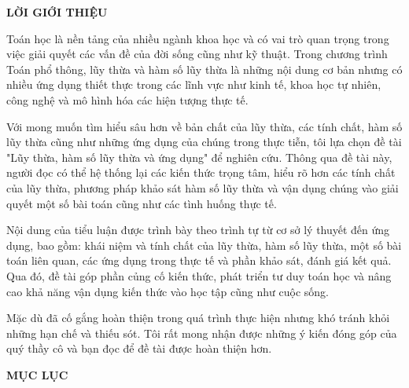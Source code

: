 \documentclass{article}
\begin{document}
\begin{center}
    \textbf{\Large LỜI GIỚI THIỆU}
\end{center}

\vspace{0.5cm}

\noindent Toán học là nền tảng của nhiều ngành khoa học và có vai trò quan trọng trong việc giải quyết các vấn đề của đời sống cũng như kỹ thuật. Trong chương trình Toán phổ thông, lũy thừa và hàm số lũy thừa là những nội dung cơ bản nhưng có nhiều ứng dụng thiết thực trong các lĩnh vực như kinh tế, khoa học tự nhiên, công nghệ và mô hình hóa các hiện tượng thực tế.

Với mong muốn tìm hiểu sâu hơn về bản chất của lũy thừa, các tính chất, hàm số lũy thừa cũng như những ứng dụng của chúng trong thực tiễn, tôi lựa chọn đề tài "Lũy thừa, hàm số lũy thừa và ứng dụng" để nghiên cứu. Thông qua đề tài này, người đọc có thể hệ thống lại các kiến thức trọng tâm, hiểu rõ hơn các tính chất của lũy thừa, phương pháp khảo sát hàm số lũy thừa và vận dụng chúng vào giải quyết một số bài toán cũng như các tình huống thực tế.

Nội dung của tiểu luận được trình bày theo trình tự từ cơ sở lý thuyết đến ứng dụng, bao gồm: khái niệm và tính chất của lũy thừa, hàm số lũy thừa, một số bài toán liên quan, các ứng dụng trong thực tế và phần khảo sát, đánh giá kết quả. Qua đó, đề tài góp phần củng cố kiến thức, phát triển tư duy toán học và nâng cao khả năng vận dụng kiến thức vào học tập cũng như cuộc sống.

Mặc dù đã cố gắng hoàn thiện trong quá trình thực hiện nhưng khó tránh khỏi những hạn chế và thiếu sót. Tôi rất mong nhận được những ý kiến đóng góp của quý thầy cô và bạn đọc để đề tài được hoàn thiện hơn.

\newpage
\begin{center}
    \textbf{\Large MỤC LỤC}
\end{center}

\vspace{0.5cm}
\end{document}
